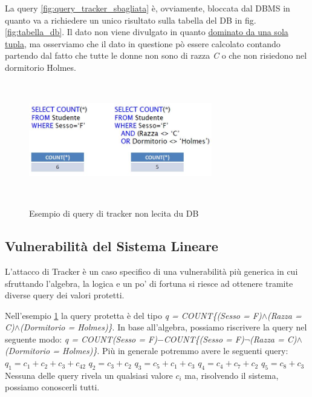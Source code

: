 La query \ref{fig:query_tracker_sbagliata} è, ovviamente, bloccata dal DBMS in quanto va a richiedere un unico risultato sulla tabella del DB in fig. \ref{fig:tabella_db}.
Il dato non viene divulgato in quanto \underline{dominato da una sola tupla}, ma osserviamo che il dato in questione pò essere calcolato contando partendo dal fatto che tutte le donne non sono di razza \textit{C} o che non risiedono nel dormitorio Holmes.

\begin{figure}[htpb]
\centering
	{\includegraphics[height=5cm, width=8cm, keepaspectratio]{Immagini/Appendice1/prot_dati_14.JPG}}
		\caption{Esempio di query di tracker non lecita du DB
				  \label{fig:query_tracker}}  
\end{figure}

\subsection{Vulnerabilità del Sistema Lineare}
L'attacco di Tracker è un caso specifico di una vulnerabilità più generica in cui sfruttando l'algebra, la logica e un po' di fortuna si riesce ad ottenere tramite diverse query dei valori protetti.

Nell'esempio \ref{fig:query_tracker} la query protetta è del tipo \textit{q = COUNT\{(Sesso = F)}$\wedge$\textit{(Razza = C)}$\wedge$\textit{(Dormitorio = Holmes)\}}.
\newline
In base all'algebra, possiamo riscrivere la query nel seguente modo: 
\textit{q = COUNT(Sesso = F)}$-$\textit{COUNT\{(Sesso = F)}$\neg$\textit{(Razza = C)}$\wedge$\textit{(Dormitorio = Holmes)\}}.
\newline
Più in generale potremmo avere le seguenti query:
\newline
$q_{1} = c_{1} + c_{2} + c_{3} + c_{42}$
\newline
$q_{2} = c_{3} + c_{2} $
\newline
$q_{3} = c_{5} + c_{1} + c_{3}$
\newline
$q_{4} = c_{4} + c_{7} + c_{2}$
\newline
$q_{5} = c_{8} + c_{3}$
\\
Nessuna delle query rivela un qualsiasi valore $c_{i}$ ma, risolvendo il sistema, possiamo conoscerli tutti.

